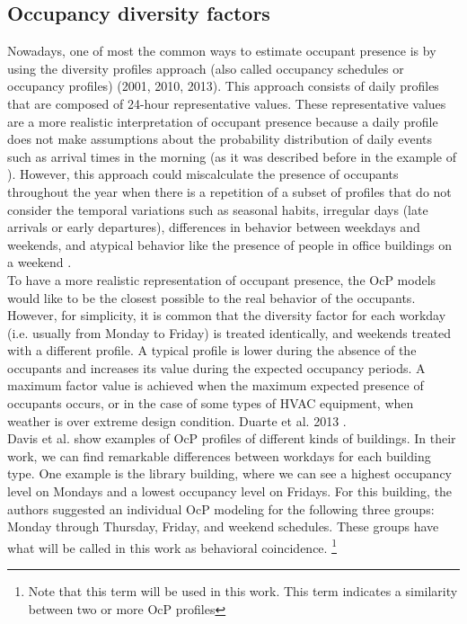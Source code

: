 \subsection{Occupancy diversity factors}

Nowadays, one of most the common ways to estimate occupant presence is by using the diversity profiles approach (also called occupancy schedules or occupancy profiles) \cite{profile_comp_2001,davis2010occupancy,duarte2013revealing}(2001, 2010, 2013). This approach consists of daily profiles that are composed of 24-hour representative values. These representative values are a more realistic interpretation of occupant presence because a daily profile does not make assumptions about the probability distribution of daily events such as arrival times in the morning (as it was described before in the example of \cite{wang_2005}). However, this approach could miscalculate the presence of occupants throughout the year when there is a repetition of a subset of profiles that do not consider the temporal variations such as seasonal habits, irregular days (late arrivals or early departures), differences in behavior between weekdays and weekends, and atypical behavior like the presence of people
in office buildings on a weekend \cite{davis2010occupancy}.   \\

To have a more realistic representation of occupant presence, the OcP models would like to be the closest possible to the real behavior of the occupants. However, for simplicity, it is common that the diversity factor for each workday (i.e. usually from Monday to Friday) is treated identically, and weekends treated with a different profile. A typical profile is lower during the absence of the occupants and increases its value during the expected occupancy periods. A maximum factor value is achieved when the maximum expected presence of occupants occurs, or in the case of some types of  HVAC equipment, when weather is over extreme design condition. Duarte et al. 2013 \cite{duarte2013revealing}.  \\

Davis et al. \cite{davis2010occupancy} show examples of OcP profiles of different kinds of buildings. In their work, we can find remarkable differences between workdays for each building type. One example is the library building, where we can see a highest occupancy level on Mondays and a lowest occupancy level on Fridays. For this building, the authors suggested an individual OcP modeling for the following three groups: Monday through Thursday, Friday, and weekend schedules. These groups have what will be called in this work as behavioral coincidence. \footnote{Note that this term will be used in this work. This term indicates a similarity between two or more OcP profiles}      


